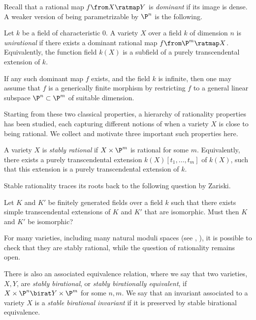 Recall that a rational map $f \from X \ratmap Y$ is \emph{dominant} if its image is dense. A weaker version of being parametrizable by $\P^n$ is the following.
\begin{definition}
	\label{def:Unirational}
	Let $k$ be a field of characteristic 0. A variety $X$ over a field $k$ of dimension $n$ is \emph{unirational} if there exists a dominant rational map $f \from \P^m \ratmap X$. Equivalently, the function field $k(X)$ is a subfield of a purely transcendental extension of $k$.
\end{definition}
\begin{remark}
	If any such dominant map $f$ exists, and the field $k$ is infinite, then one may assume that $f$ is a generically finite morphism by restricting $f$ to a general linear subspace $\P^n \subset \P^m$ of suitable dimension.
\end{remark}
Starting from these two classical properties, a hierarchy of rationality properties has been studied, each capturing different notions of when a variety $X$ is close to being rational. We collect and motivate three important such properties here.
\begin{definition}
	\label{def:StablyRational}
	A variety $X$ is \emph{stably rational} if $X \times \P^m$ is rational for some $m$. Equivalently, there exists a purely transcendental extension $k(X)[t_1,\dots,t_m]$ of $k(X)$, such that this extension is a purely transcendental extension of $k$.
\end{definition}
Stable rationality traces its roots back to the following question by Zariski.
\begin{question}
	\label{que:Zariski}
	Let $K$ and $K'$ be finitely generated fields over a field $k$ such that there exists simple transcendental extensions of $K$ and $K'$ that are isomorphic. Must then $K$ and $K'$ be isomorphic?
\end{question}
For many varieties, including many natural moduli spaces (see \eg \cite{Ballico}, \cite{KollarSchreyer}), it is possible to check that they are stably rational, while the question of rationality remains open.

There is also an associated equivalence relation, where we say that two varieties, $X,Y$, are \emph{stably birational}, or \emph{stably birationally equivalent}, if $X \times \P^n \birat Y \times \P^m$ for some $n,m$. We say that an invariant associated to a variety $X$ is a \emph{stable birational invariant} if it is preserved by stable birational equivalence.

